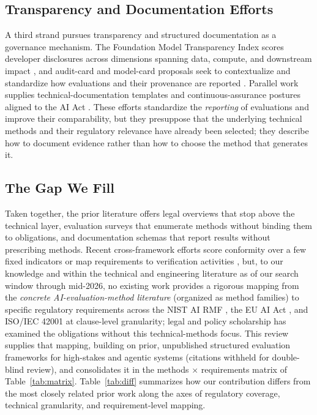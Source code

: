 \subsection{Transparency and Documentation Efforts}

A third strand pursues transparency and structured documentation as a governance mechanism. The Foundation Model Transparency Index scores developer disclosures across dimensions spanning data, compute, and downstream impact \cite{wan2025fmti, raffel2024transparency}, and audit-card and model-card proposals seek to contextualize and standardize how evaluations and their provenance are reported \cite{staufer2025auditcards, puhlfurss2025modelcards}. Parallel work supplies technical-documentation templates and continuous-assurance postures aligned to the AI Act \cite{lucaj2025techops, lupo2026trustworthyposture}. These efforts standardize the \textit{reporting} of evaluations and improve their comparability, but they presuppose that the underlying technical methods and their regulatory relevance have already been selected; they describe how to document evidence rather than how to choose the method that generates it.

\subsection{The Gap We Fill}

Taken together, the prior literature offers legal overviews that stop above the technical layer, evaluation surveys that enumerate methods without binding them to obligations, and documentation schemas that report results without prescribing methods. Recent cross-framework efforts score conformity over a few fixed indicators or map requirements to verification activities \cite{min2026cave,buscemi2025assessing,butt2026policy}, but, to our knowledge and within the technical and engineering literature as of our search window through mid-2026, no existing work provides a rigorous mapping from the \emph{concrete AI-evaluation-method literature} (organized as method families) to specific regulatory requirements across the NIST AI RMF \cite{nist2023airmf}, the EU AI Act \cite{euaiact2024}, and ISO/IEC 42001 \cite{iso42001} at clause-level granularity; legal and policy scholarship has examined the obligations without this technical-methods focus. This review supplies that mapping, building on prior, unpublished structured evaluation frameworks for high-stakes and agentic systems (citations withheld for double-blind review), and consolidates it in the methods $\times$ requirements matrix of Table~\ref{tab:matrix}. Table~\ref{tab:diff} summarizes how our contribution differs from the most closely related prior work along the axes of regulatory coverage, technical granularity, and requirement-level mapping.
